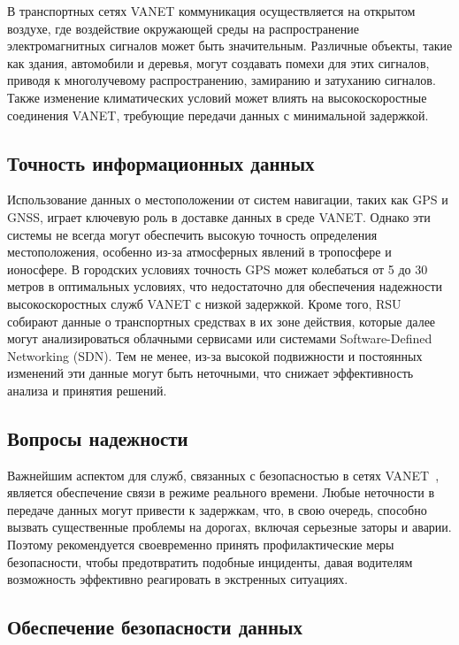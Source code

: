 В транспортных сетях VANET коммуникация осуществляется на открытом воздухе, где воздействие окружающей среды на распространение электромагнитных сигналов может быть значительным. Различные объекты, такие как здания, автомобили и деревья, могут создавать помехи для этих сигналов, приводя к многолучевому распространению, замиранию и затуханию сигналов. Также изменение климатических условий может влиять на высокоскоростные соединения VANET, требующие передачи данных с минимальной задержкой.

\subsection*{Точность информационных данных}

Использование данных о местоположении от систем навигации, таких как GPS и GNSS, играет ключевую роль в доставке данных в среде VANET. Однако эти системы не всегда могут обеспечить высокую точность определения местоположения, особенно из-за атмосферных явлений в тропосфере и ионосфере. В городских условиях точность GPS может колебаться от 5 до 30 метров в оптимальных условиях, что недостаточно для обеспечения надежности высокоскоростных служб VANET с низкой задержкой. Кроме того, RSU собирают данные о транспортных средствах в их зоне действия, которые далее могут анализироваться облачными сервисами или системами Software-Defined Networking (SDN). Тем не менее, из-за высокой подвижности и постоянных изменений эти данные могут быть неточными, что снижает эффективность анализа и принятия решений.

\subsection*{Вопросы надежности}

Важнейшим аспектом для служб, связанных с безопасностью в сетях VANET~\cite{hahn2019security}, является обеспечение связи в режиме реального времени. Любые неточности в передаче данных могут привести к задержкам, что, в свою очередь, способно вызвать существенные проблемы на дорогах, включая серьезные заторы и аварии. Поэтому рекомендуется своевременно принять профилактические меры безопасности, чтобы предотвратить подобные инциденты, давая водителям возможность эффективно реагировать в экстренных ситуациях.

\subsection*{Обеспечение безопасности данных}

